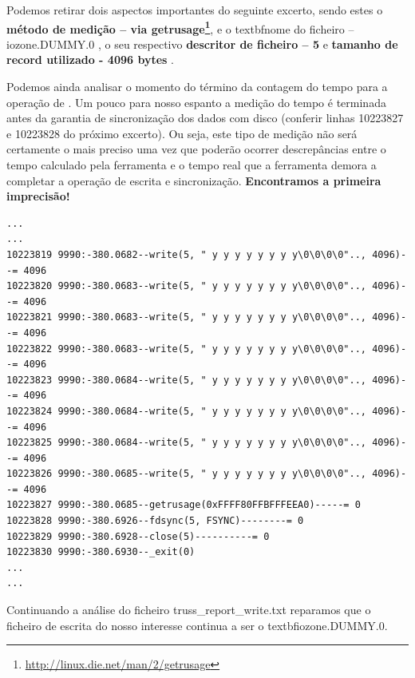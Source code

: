\documentclass[a4paper]{article}
\begin{document}
{Podemos retirar dois aspectos importantes do seguinte excerto, sendo estes o \textbf{método de medição -- via getrusage\footnote{\url{http://linux.die.net/man/2/getrusage}}},  e o textbf{nome do ficheiro -- iozone.DUMMY.0} , o seu respectivo \textbf{descritor de ficheiro  -- 5}  e \textbf{ tamanho de record utilizado - 4096 bytes }.\par 
Podemos ainda analisar o momento do término da contagem do tempo para a operação de . Um pouco para nosso espanto a medição do tempo é terminada antes da garantia de sincronização dos dados com disco (conferir linhas 10223827 e 10223828 do próximo excerto). Ou seja, este tipo de medição não será certamente o mais preciso uma vez que poderão ocorrer descrepâncias entre o tempo calculado pela ferramenta e o tempo real que a ferramenta demora a completar a operação de escrita e sincronização. \textbf{Encontramos a primeira imprecisão!}
\label{imprecisao}
\begin{lstlisting}
...
...
10223819 9990:-380.0682--write(5, " y y y y y y y y\0\0\0\0".., 4096)--= 4096
10223820 9990:-380.0683--write(5, " y y y y y y y y\0\0\0\0".., 4096)--= 4096
10223821 9990:-380.0683--write(5, " y y y y y y y y\0\0\0\0".., 4096)--= 4096
10223822 9990:-380.0683--write(5, " y y y y y y y y\0\0\0\0".., 4096)--= 4096
10223823 9990:-380.0684--write(5, " y y y y y y y y\0\0\0\0".., 4096)--= 4096
10223824 9990:-380.0684--write(5, " y y y y y y y y\0\0\0\0".., 4096)--= 4096
10223825 9990:-380.0684--write(5, " y y y y y y y y\0\0\0\0".., 4096)--= 4096
10223826 9990:-380.0685--write(5, " y y y y y y y y\0\0\0\0".., 4096)--= 4096
10223827 9990:-380.0685--getrusage(0xFFFF80FFBFFFEEA0)-----= 0
10223828 9990:-380.6926--fdsync(5, FSYNC)--------= 0
10223829 9990:-380.6928--close(5)----------= 0
10223830 9990:-380.6930--_exit(0)
...
...
\end{lstlisting}

Continuando a análise do ficheiro truss\_report\_write.txt reparamos que o ficheiro de escrita do nosso interesse continua a ser o textbf{iozone.DUMMY.0}.


}
\end{document}
